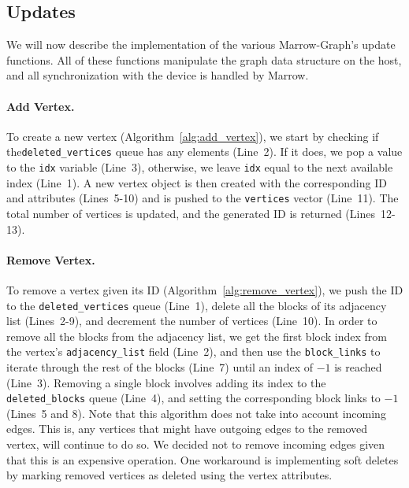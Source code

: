 \subsection{Updates}

We will now describe the implementation of the various Marrow-Graph's update functions. All of these functions manipulate the graph data structure on the host, and all synchronization with the device is handled by Marrow.

\paragraph{\textbf{Add Vertex}.} To create a new vertex (Algorithm~\ref{alg:add_vertex}), we start by checking if the\linebreak \texttt{deleted\_vertices} queue has any elements (Line~2). If it does, we pop a value to the \texttt{idx} variable (Line~3), otherwise, we leave \texttt{idx} equal to the next available index (Line~1). A new vertex object is then created with the corresponding ID and attributes (Lines~5-10) and is pushed to the \texttt{vertices} vector (Line~11). The total number of vertices is updated, and the generated ID is returned (Lines~12-13).




\paragraph{\textbf{Remove Vertex}.} To remove a vertex given its ID (Algorithm~\ref{alg:remove_vertex}), we push the ID to the \texttt{deleted\_vertices} queue (Line~1), delete all the blocks of its adjacency list (Lines~2-9), and decrement the number of vertices (Line~10). In order to remove all the blocks from the adjacency list, we get the first block index from the vertex's \texttt{adjacency\_list} field (Line~2), and then use the \texttt{block\_links} to iterate through the rest of the blocks (Line~7) until an index of $-1$ is reached (Line~3). Removing a single block involves adding its index to the \texttt{deleted\_blocks} queue (Line~4), and setting the corresponding block links to $-1$ (Lines~5 and 8). Note that this algorithm does not take into account incoming edges. This is, any vertices that might have outgoing edges to the removed vertex, will continue to do so. We decided not to remove incoming edges given that this is an expensive operation. One workaround is implementing soft deletes by marking removed vertices as deleted using the vertex attributes.


